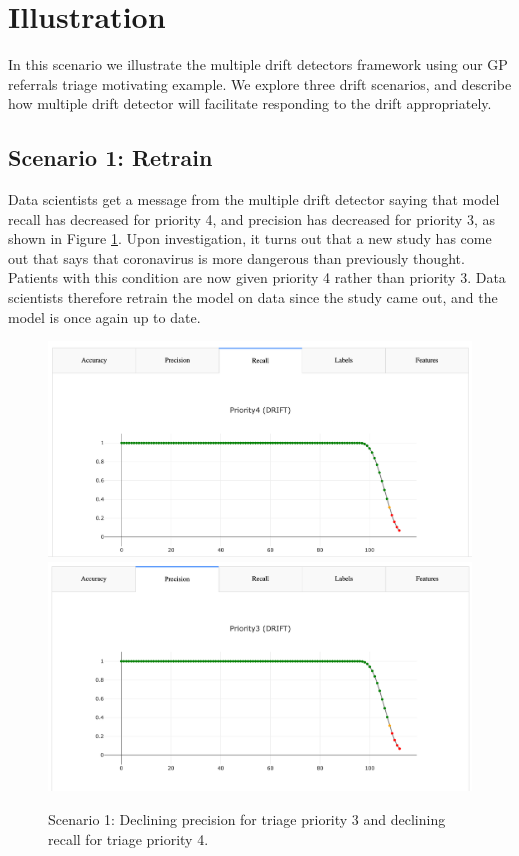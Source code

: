 
\section{Illustration} \label{mdd:illustration}

In this scenario we illustrate the multiple drift detectors framework using our GP referrals triage motivating example. We explore three drift scenarios, and describe how multiple drift detector will facilitate responding to the drift appropriately. 

\subsection{Scenario 1: Retrain}

Data scientists get a message from the multiple drift detector saying that model recall has decreased for priority 4, and precision has decreased for priority 3, as shown in Figure \ref{fig:scenario1}. Upon investigation, it turns out that a new study has come out that says that coronavirus is more dangerous than previously thought. Patients with this condition are now given priority 4 rather than priority 3.
Data scientists therefore retrain the model on data since the study came out, and the model is once again up to date.

\begin{figure}
    \centering
    \includegraphics[width=\textwidth]{images/recall_p4.png}
    \includegraphics[width=\textwidth]{images/precision_p3.png}
    \caption{Scenario 1: Declining precision for triage priority 3 and declining recall for triage priority 4.}
    \label{fig:scenario1}
\end{figure}
 

